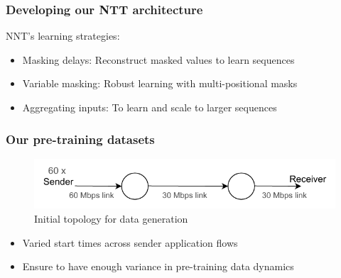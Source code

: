 \documentclass{beamer}
\begin{document}
\begin{frame}
\frametitle{Developing our NTT architecture}

NNT's learning strategies: 
\pause 
\begin{itemize}
    \item<1-> \alert{Masking delays:} Reconstruct masked values to learn sequences 
    \item<1-> \alert{Variable masking:} Robust learning with multi-positional masks
    \item<1-> \alert{Aggregating inputs:} To learn and scale to larger sequences
\end{itemize}
\end{frame}



\begin{frame}
\frametitle{Our pre-training datasets}


\begin{figure}[h]
  \begin{center}
    \includegraphics[scale=0.8]{figures/simple_topo.pdf}
    \caption{Initial topology for data generation}
    \label{fig:topo}
  \end{center}
\end{figure}
 
 \pause

\begin{itemize}
    \item<1-> Varied start times across sender application flows
    \item<1-> Ensure to have enough variance in pre-training data dynamics 
    \end{itemize}

\end{frame}
\end{document}
